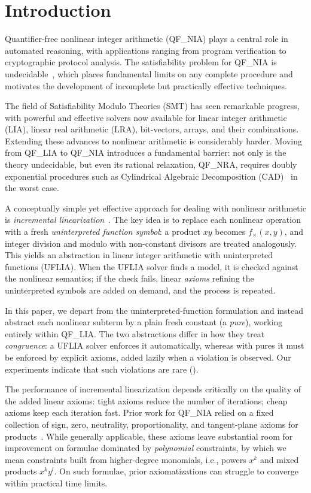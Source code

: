 \section{Introduction}

Quantifier-free nonlinear integer arithmetic (QF\_NIA) plays a central role
in automated reasoning, with applications ranging from program verification to
cryptographic protocol analysis. The satisfiability problem for QF\_NIA is
undecidable~\cite{matiyasevich1993hilbert}, which places fundamental limits on
any complete procedure and motivates the development of incomplete but
practically effective techniques.

The field of Satisfiability Modulo Theories (SMT) has seen remarkable pro\-gress,
with powerful and effective solvers now available for
linear integer arithmetic (LIA), linear real arithmetic (LRA), bit-vectors,
arrays, and their combinations.
Extending these advances to nonlinear arithmetic is considerably harder.
Moving from QF\_LIA to QF\_NIA introduces a fundamental barrier: not only is
the theory undecidable, but even its rational relaxation, QF\_NRA, requires
doubly exponential procedures such as Cylindrical Algebraic Decomposition
(CAD)~\cite{collins75} in the worst case.

A conceptually simple yet effective approach for dealing with nonlinear
arithmetic is \emph{incremental linearization}~\cite{cimatti2017,cimatti-tcl18,cimatti2018sat}.
The key idea is to replace each nonlinear operation with a fresh
\emph{uninterpreted function symbol}: a product $x y$ becomes
$f_\times(x, y)$, and integer division and modulo with non-constant divisors
are treated analogously.
This yields an abstraction in linear integer arithmetic with uninterpreted
functions (UFLIA).
When the UFLIA solver finds a model, it is checked
against the nonlinear semantics; if the check fails, linear \emph{axioms}
refining the uninterpreted symbols are added on demand, and the process is
repeated.

In this paper, we depart from the uninterpreted-function formulation and
instead abstract each nonlinear subterm by a plain fresh constant (a
\emph{pure}), working entirely within QF\_LIA\@.
The two abstractions differ in how they treat \emph{congruence}: a UFLIA
solver enforces it automatically, whereas with pures it must be enforced by
explicit axioms, added lazily when a violation is observed.
Our experiments indicate that such violations are rare ().

The performance of incremental linearization depends critically on the quality
of the added linear axioms: tight axioms reduce the number of iterations;
cheap axioms keep each iteration fast.
Prior work for QF\_NIA relied on a fixed collection of sign, zero, neutrality,
proportionality, and tangent-plane axioms for products~\cite{cimatti2018sat}.
While generally applicable, these axioms leave substantial room for improvement
on formulae dominated by \emph{polynomial} constraints, by which we mean
constraints built from higher-degree monomials, i.e., powers
$x^k$ and mixed products $x^k y^l$.
On such formulae, prior axiomatizations can struggle to converge within
practical time limits.

